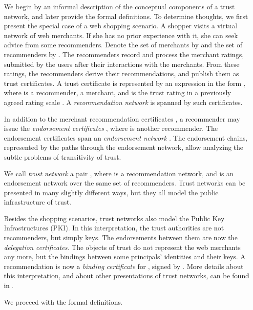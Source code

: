 \documentclass{llncs}
\begin{document}
We begin by an informal description of the conceptual components of a trust network, and later provide the formal definitions. To determine thoughts, we first present the special case of a web shopping scenario. A shopper visits a virtual network of web merchants. If she has no prior experience with it, she can seek advice from some recommenders. Denote the set of merchants by  and the set of recommenders by . The recommenders record and process the merchant ratings, submitted by the users after their interactions with the merchants. From these ratings, the recommenders derive their  recommendations, and publish them as trust certificates. A trust certificate  is represented by an expression in the form , where  is a recommender,  a merchant, and  is the trust rating in a previously agreed rating scale . A {\em recommendation network\/}  is spanned by such certificates.

In addition to the merchant recommendation certificates , a recommender  may issue the {\em endorsement certificates} , where  is another recommender. The endorsement certificates span an {\em endorsement network} . The endorsement chains, represented by the paths through the endorsement network, allow analyzing the subtle problems of transitivity of trust.



We call {\em trust network\/} a pair , where  is a recommendation network, and  is an endorsement network over the same set  of recommenders. Trust networks can be presented in many slightly different ways, but they all model the public infrastructure of trust.

Besides the shopping scenarios, trust networks also model the Public Key Infrastructures (PKI). In this interpretation, the trust authorities  are not recommenders, but simply keys. The endorsements  between them are now the {\em delegation certificates}. The objects of trust  do not represent the web merchants any more, but the bindings between some principals' identities and their keys. A recommendation  is now a {\em binding certificate} for , signed by . More details about this interpretation, and about other presentations of trust networks, can be found in \cite{BBK,LevienR,MaurerU:Trust,ReiterM:Metric}.

We proceed with the formal definitions.
\end{document}
